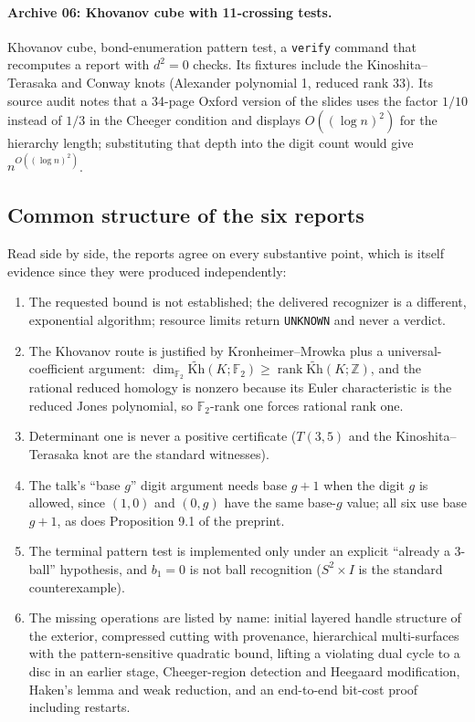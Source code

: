 \documentclass[11pt]{article}
\theoremstyle{remark}
\newcommand{\F}{\mathbb{F}_2}
\newcommand{\Kh}{\widetilde{\mathrm{Kh}}}
\newcommand{\code}[1]{\texttt{#1}}
\begin{document}
\paragraph{Archive 06: Khovanov cube with 11-crossing tests.}
Khovanov cube, bond-enumeration pattern test, a \code{verify} command that
recomputes a report with $d^2=0$ checks. Its fixtures include the
Kinoshita--Terasaka and Conway knots (Alexander polynomial 1, reduced rank
33). Its source audit notes that a 34-page Oxford version of the slides uses
the factor $1/10$ instead of $1/3$ in the Cheeger condition and displays
$O((\log n)^2)$ for the hierarchy length; substituting that depth into the
digit count would give $n^{O((\log n)^2)}$.

\subsection{Common structure of the six reports}
Read side by side, the reports agree on every substantive point, which is
itself evidence since they were produced independently:
\begin{enumerate}
\item The requested bound is not established; the delivered recognizer is a
  different, exponential algorithm; resource limits return \code{UNKNOWN}
  and never a verdict.
\item The Khovanov route is justified by Kronheimer--Mrowka \cite{km} plus a
  universal-coefficient argument: $\dim_{\F}\Kh(K;\F)\ge\operatorname{rank}\Kh(K;\mathbb Z)$,
  and the rational reduced homology is nonzero because its Euler
  characteristic is the reduced Jones polynomial, so $\F$-rank one forces
  rational rank one.
\item Determinant one is never a positive certificate ($T(3,5)$ and the
  Kinoshita--Terasaka knot are the standard witnesses).
\item The talk's ``base $g$'' digit argument needs base $g+1$ when the digit
  $g$ is allowed, since $(1,0)$ and $(0,g)$ have the same base-$g$ value; all
  six use base $g+1$, as does Proposition 9.1 of the preprint.
\item The terminal pattern test is implemented only under an explicit
  ``already a 3-ball'' hypothesis, and $b_1=0$ is not ball recognition
  ($S^2\times I$ is the standard counterexample).
\item The missing operations are listed by name: initial layered handle
  structure of the exterior, compressed cutting with provenance,
  hierarchical multi-surfaces with the pattern-sensitive quadratic bound,
  lifting a violating dual cycle to a disc in an earlier stage, Cheeger-region
  detection and Heegaard modification, Haken's lemma and weak reduction, and
  an end-to-end bit-cost proof including restarts.
\end{enumerate}
\end{document}
